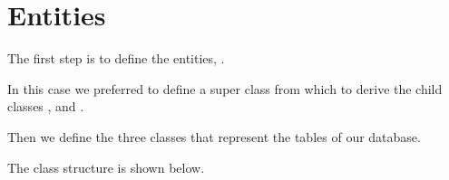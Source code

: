 \section{Entities}

The first step is to define the entities, .

In this case we preferred to define a super class  from which to
derive the child classes ,  and .



Then we define the three classes that represent the tables of our database.

The class structure is shown below.






